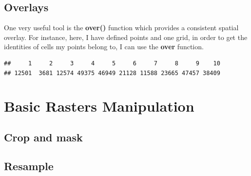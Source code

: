 \documentclass[]{report}
\newenvironment{Shaded}{\begin{snugshade}}{\end{snugshade}}
\newcommand{\KeywordTok}[1]{\textcolor[rgb]{0.13,0.29,0.53}{\textbf{{#1}}}}
\newcommand{\CommentTok}[1]{\textcolor[rgb]{0.56,0.35,0.01}{\textit{{#1}}}}
\newcommand{\NormalTok}[1]{{#1}}
\begin{document}
\section{Overlays}\label{overlays}

One very useful tool is the \textbf{over()} function which provides a
consistent spatial overlay. For instance, here, I have defined points
and one grid, in order to get the identities of cells my points belong
to, I can use the \textbf{over} function.

\begin{Shaded}
\end{Shaded}

\begin{verbatim}
##     1     2     3     4     5     6     7     8     9    10 
## 12501  3681 12574 49375 46949 21128 11588 23665 47457 38409
\end{verbatim}

\chapter{Basic Rasters Manipulation}\label{basic-rasters-manipulation}

\section{Crop and mask}\label{crop-and-mask}

\section{Resample}\label{resample}
\end{document}
